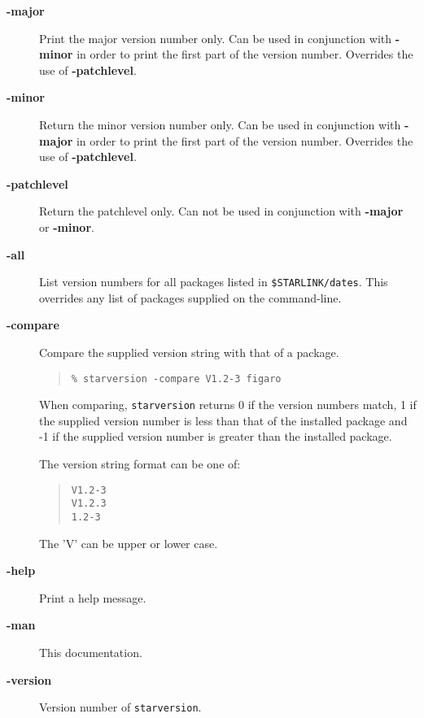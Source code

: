 \documentclass[twoside,11pt]{article}
\newenvironment{myquote}{\begin{quote}\begin{small}}{\end{small}\end{quote}}
\renewcommand{\_}{\texttt{\symbol{95}}}
\begin{document}
\begin{description}
\item[\textbf{-major}] \mbox{}

Print the major version number only. Can be used in conjunction with
\textbf{-minor} in order to print the first part of the version number.
Overrides the use of \textbf{-patchlevel}.

\item[\textbf{-minor}] \mbox{}

Return the minor version number only. Can be used in conjunction
with \textbf{-major} in order to print the first part of the version number.
Overrides the use of \textbf{-patchlevel}.

\item[\textbf{-patchlevel}] \mbox{}

Return the patchlevel only. Can not be used in conjunction with
\textbf{-major} or \textbf{-minor}.

\item[\textbf{-all}] \mbox{}

List version numbers for all packages listed in \texttt{\$STARLINK/dates}.
This overrides any list of packages supplied on the command-line.

\item[\textbf{-compare}] \mbox{}

Compare the supplied version string with that of a package.

\begin{myquote}
\begin{verbatim}
% starversion -compare V1.2-3 figaro
\end{verbatim}
\end{myquote}

When comparing, \texttt{starversion} returns 0 if the version numbers match,
1 if the supplied version number is less than that of the installed
package and -1 if the supplied version number is greater than the
installed package.

The version string format can be one of:

\begin{myquote}
\begin{verbatim}
V1.2-3
V1.2.3
1.2-3
\end{verbatim}
\end{myquote}

The 'V' can be upper or lower case.

\item[\textbf{-help}] \mbox{}

Print a help message.

\item[\textbf{-man}] \mbox{}

This documentation.

\item[\textbf{-version}] \mbox{}

Version number of \texttt{starversion}.

\end{description}
\end{document}
